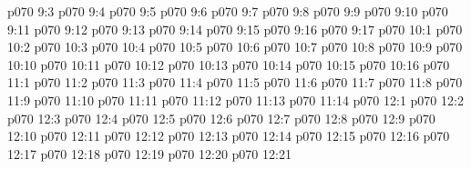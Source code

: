 \vs p070 9:3 
\vs p070 9:4 
\vs p070 9:5 
\vs p070 9:6 
\vs p070 9:7 
\vs p070 9:8 
\vs p070 9:9 
\vs p070 9:10 
\vs p070 9:11 
\vs p070 9:12 
\vs p070 9:13 \pc 
\vs p070 9:14 
\vs p070 9:15 
\vs p070 9:16 
\vs p070 9:17 
\vs p070 10:1 
\vs p070 10:2 
\vs p070 10:3 
\vs p070 10:4 \pc 
\vs p070 10:5 
\vs p070 10:6 
\vs p070 10:7 
\vs p070 10:8 
\vs p070 10:9 \pc 
\vs p070 10:10 
\vs p070 10:11 
\vs p070 10:12 
\vs p070 10:13 \pc 
\vs p070 10:14 \pc 
\vs p070 10:15 
\vs p070 10:16 
\vs p070 11:1 
\vs p070 11:2 
\vs p070 11:3 
\vs p070 11:4 \pc 
\vs p070 11:5 
\vs p070 11:6 
\vs p070 11:7 
\vs p070 11:8 \pc 
\vs p070 11:9 
\vs p070 11:10 
\vs p070 11:11 
\vs p070 11:12 
\vs p070 11:13 \pc 
\vs p070 11:14 
\vs p070 12:1 
\vs p070 12:2 \pc 
\vs p070 12:3 
\vs p070 12:4 
\vs p070 12:5 \pc 
\vs p070 12:6 
\vs p070 12:7 
\vs p070 12:8 
\vs p070 12:9 
\vs p070 12:10 
\vs p070 12:11 
\vs p070 12:12 
\vs p070 12:13 
\vs p070 12:14 
\vs p070 12:15 
\vs p070 12:16 
\vs p070 12:17 
\vs p070 12:18 
\vs p070 12:19 \pc 
\vs p070 12:20 
\vsetoff
\vs p070 12:21 
\quizlink
